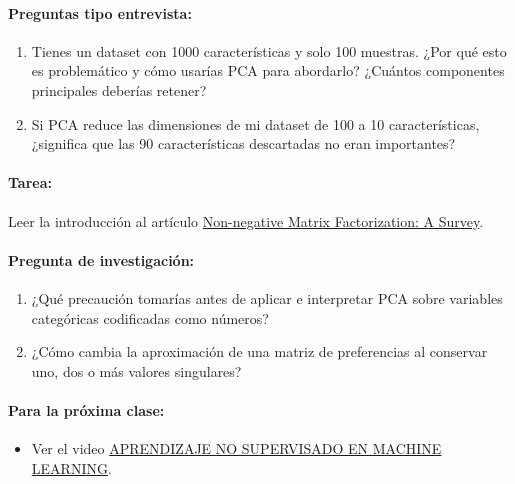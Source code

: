 \documentclass[a4,11pt]{aleph-notas}
\begin{document}
\paragraph{Preguntas tipo entrevista:} 
\begin{enumerate}[leftmargin=*]
    \item Tienes un dataset con 1000 características y solo 100 muestras. ¿Por qué esto es problemático y cómo usarías PCA para abordarlo? ¿Cuántos componentes principales deberías retener?
    
    \item Si PCA reduce las dimensiones de mi dataset de 100 a 10 características, ¿significa que las 90 características descartadas no eran importantes?
\end{enumerate}

\paragraph{Tarea:} Leer la introducción al artículo \href{https://mro.massey.ac.nz/server/api/core/bitstreams/7dbd6b5e-4d71-490a-b1b6-654e40181693/content}{Non-negative Matrix Factorization: A Survey}.

\paragraph{Pregunta de investigación:} 
\begin{enumerate}[leftmargin=*]
    \item ¿Qué precaución tomarías antes de aplicar e interpretar PCA sobre variables categóricas codificadas como números?
    \item ¿Cómo cambia la aproximación de una matriz de preferencias al conservar uno, dos o más valores singulares?
\end{enumerate}
    
\paragraph{Para la próxima clase:} 
\begin{itemize}
    \item Ver el video \href{https://youtu.be/NyhnBI2aJmQ?si=XLyDJCydPYe1e2T1}{APRENDIZAJE NO SUPERVISADO EN MACHINE LEARNING}.
\end{itemize}
\end{document}
